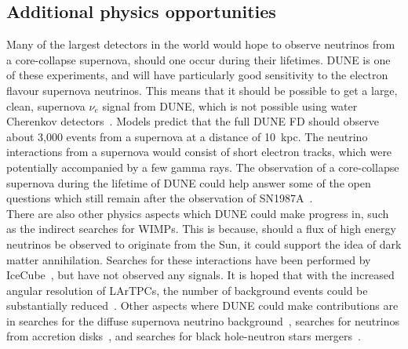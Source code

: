 \subsection{Additional physics opportunities} \label{sec:DUNE_Other}%
Many of the largest detectors in the world would hope to observe neutrinos from a core-collapse supernova, should one occur during their lifetimes. DUNE is one of these experiments, and will have particularly good sensitivity to the electron flavour supernova neutrinos. This means that it should be possible to get a large, clean, supernova $\nu_e$ signal from DUNE, which is not possible using water Cherenkov detectors~\citep{KScholSND, Laha:2013hva}. Models predict that the full DUNE FD should observe about 3,000 events from a supernova at a distance of 10~kpc. The neutrino interactions from a supernova would consist of short electron tracks, which were potentially accompanied by a few gamma rays. The observation of a core-collapse supernova during the lifetime of DUNE could help answer some of the open questions which still remain after the observation of SN1987A~\citep{PhysRevLett.58.1494, PhysRevLett.58.1490}. \\

There are also other physics aspects which DUNE could make progress in, such as the indirect searches for WIMPs. This is because, should a flux of high energy neutrinos be observed to originate from the Sun, it could support the idea of dark matter annihilation. Searches for these interactions have been performed by IceCube~\citep{Aartsen:2012kia, Choi:2015ara}, but have not observed any signals. It is hoped that with the increased angular resolution of LArTPCs, the number of background events could be substantially reduced~\citep{DUNECDR_V2}. Other aspects where DUNE could make contributions are in searches for the diffuse supernova neutrino background~\citep{Beacom:2010kk}, searches for neutrinos from accretion disks~\citep{Caballero:2011dw}, and searches for black hole-neutron stars mergers~\citep{Caballero:2009ww}. \\

